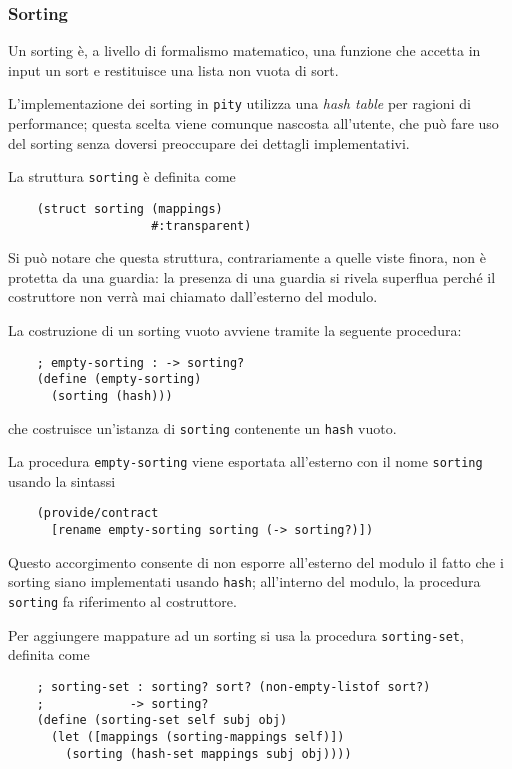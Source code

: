 \subsubsection{Sorting}

Un sorting \`e, a livello di formalismo matematico, una funzione che
accetta in input un sort e restituisce una lista non vuota di sort.

L'implementazione dei sorting in \lstinline{pity} utilizza una
\emph{hash table} per ragioni di performance; questa scelta viene
comunque nascosta all'utente, che pu\`o fare uso del sorting senza
doversi preoccupare dei dettagli implementativi.

La struttura \lstinline{sorting} \`e definita come

\begin{lstlisting}
    (struct sorting (mappings)
                    #:transparent)
\end{lstlisting}

Si pu\`o notare che questa struttura, contrariamente a quelle viste
finora, non \`e protetta da una guardia: la presenza di una guardia si
rivela superflua perch\'e il costruttore non verr\`a mai chiamato
dall'esterno del modulo.

La costruzione di un sorting vuoto avviene tramite la seguente procedura:

\begin{lstlisting}
    ; empty-sorting : -> sorting?
    (define (empty-sorting)
      (sorting (hash)))
\end{lstlisting}

che costruisce un'istanza di \lstinline{sorting} contenente un
\lstinline{hash} vuoto.

La procedura \lstinline{empty-sorting} viene esportata all'esterno con
il nome \lstinline{sorting} usando la sintassi

\begin{lstlisting}
    (provide/contract
      [rename empty-sorting sorting (-> sorting?)])
\end{lstlisting}

Questo accorgimento consente di non esporre all'esterno del modulo il
fatto che i sorting siano implementati usando \lstinline{hash};
all'interno del modulo, la procedura \lstinline{sorting} fa riferimento
al costruttore.

Per aggiungere mappature ad un sorting si usa la procedura
\lstinline{sorting-set}, definita come

\begin{lstlisting}
    ; sorting-set : sorting? sort? (non-empty-listof sort?)
    ;            -> sorting?
    (define (sorting-set self subj obj)
      (let ([mappings (sorting-mappings self)])
        (sorting (hash-set mappings subj obj))))
\end{lstlisting}

